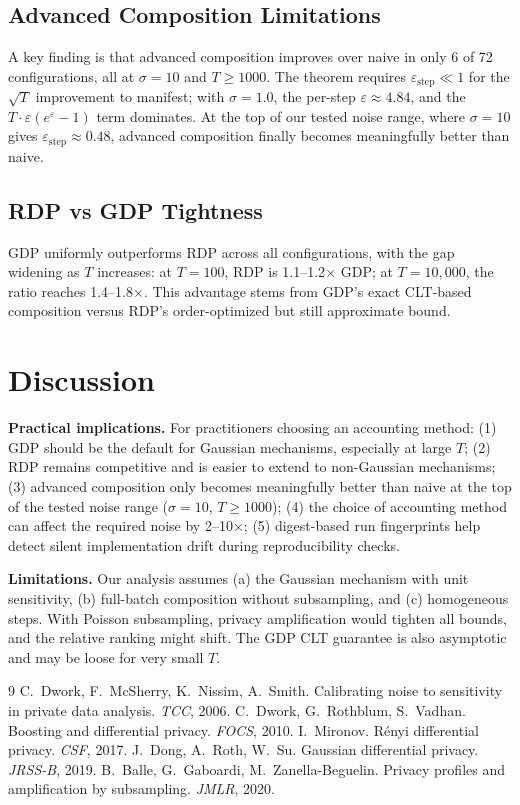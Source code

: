 \documentclass[11pt,a4paper]{article}
\begin{document}
\subsection{Advanced Composition Limitations}

A key finding is that advanced composition improves over naive in only 6 of 72 configurations, all at $\sigma = 10$ and $T \ge 1000$. The theorem requires $\varepsilon_{\text{step}} \ll 1$ for the $\sqrt{T}$ improvement to manifest; with $\sigma = 1.0$, the per-step $\varepsilon \approx 4.84$, and the $T \cdot \varepsilon(e^{\varepsilon} - 1)$ term dominates. At the top of our tested noise range, where $\sigma = 10$ gives $\varepsilon_{\text{step}} \approx 0.48$, advanced composition finally becomes meaningfully better than naive.

\subsection{RDP vs GDP Tightness}

GDP uniformly outperforms RDP across all configurations, with the gap widening as $T$ increases: at $T = 100$, RDP is 1.1--1.2$\times$ GDP; at $T = 10{,}000$, the ratio reaches 1.4--1.8$\times$. This advantage stems from GDP's exact CLT-based composition versus RDP's order-optimized but still approximate bound.

\section{Discussion}

\textbf{Practical implications.} For practitioners choosing an accounting method: (1) GDP should be the default for Gaussian mechanisms, especially at large $T$; (2) RDP remains competitive and is easier to extend to non-Gaussian mechanisms; (3) advanced composition only becomes meaningfully better than naive at the top of the tested noise range ($\sigma=10$, $T \ge 1000$); (4) the choice of accounting method can affect the required noise by 2--10$\times$; (5) digest-based run fingerprints help detect silent implementation drift during reproducibility checks.

\textbf{Limitations.} Our analysis assumes (a) the Gaussian mechanism with unit sensitivity, (b) full-batch composition without subsampling, and (c) homogeneous steps. With Poisson subsampling, privacy amplification would tighten all bounds, and the relative ranking might shift. The GDP CLT guarantee is also asymptotic and may be loose for very small $T$.

\begin{thebibliography}{9}
 C.~Dwork, F.~McSherry, K.~Nissim, A.~Smith. Calibrating noise to sensitivity in private data analysis. \emph{TCC}, 2006.
 C.~Dwork, G.~Rothblum, S.~Vadhan. Boosting and differential privacy. \emph{FOCS}, 2010.
 I.~Mironov. R\'enyi differential privacy. \emph{CSF}, 2017.
 J.~Dong, A.~Roth, W.~Su. Gaussian differential privacy. \emph{JRSS-B}, 2019.
 B.~Balle, G.~Gaboardi, M.~Zanella-Beguelin. Privacy profiles and amplification by subsampling. \emph{JMLR}, 2020.
\end{thebibliography}
\end{document}
